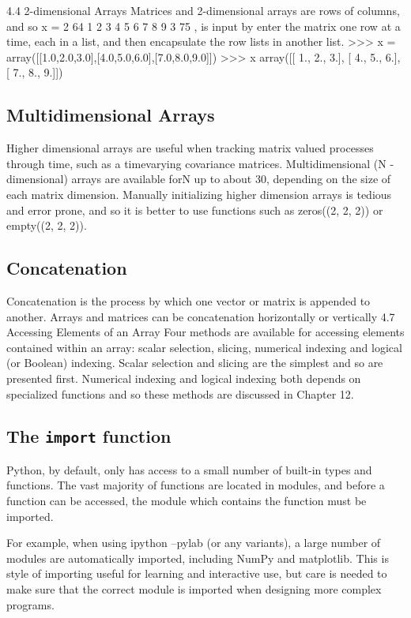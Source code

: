 \documentclass[11pt]{article} %
\begin{document}
4.4 2-dimensional Arrays
Matrices and 2-dimensional arrays are rows of columns, and so
x =
2
64
1 2 3
4 5 6
7 8 9
3
75
,
is input by enter the matrix one row at a time, each in a list, and then encapsulate the row lists in another
list.
>>> x = array([[1.0,2.0,3.0],[4.0,5.0,6.0],[7.0,8.0,9.0]])
>>> x
array([[ 1., 2., 3.],
[ 4., 5., 6.],
[ 7., 8., 9.]])
\newpage
\subsection{Multidimensional Arrays}
Higher dimensional arrays are useful when tracking matrix valued processes through time, such as a timevarying
covariance matrices. Multidimensional (N -dimensional) arrays are available forN up to about 30,
depending on the size of each matrix dimension. Manually initializing higher dimension arrays is tedious
and error prone, and so it is better to use functions such as zeros((2, 2, 2)) or empty((2, 2, 2)).
\newpage
\subsection{Concatenation}
Concatenation is the process by which one vector or matrix is appended to another. Arrays and matrices
can be concatenation horizontally or vertically
4.7 Accessing Elements of an Array
Four methods are available for accessing elements contained within an array: scalar selection, slicing,
numerical indexing and logical (or Boolean) indexing. Scalar selection and slicing are the simplest and so
are presented first. Numerical indexing and logical indexing both depends on specialized functions and
so these methods are discussed in Chapter 12.
\newpage
\subsection{The \texttt{import} function}
Python, by default, only has access to a small number of built-in types and functions. The vast majority of
functions are located in modules, and before a function can be accessed, the module which contains the
function must be imported. 

For example, when using ipython --pylab (or any variants), a large number
of modules are automatically imported, including NumPy and matplotlib. This is style of importing useful
for learning and interactive use, but care is needed to make sure that the correct module is imported when
designing more complex programs.
\end{document}
